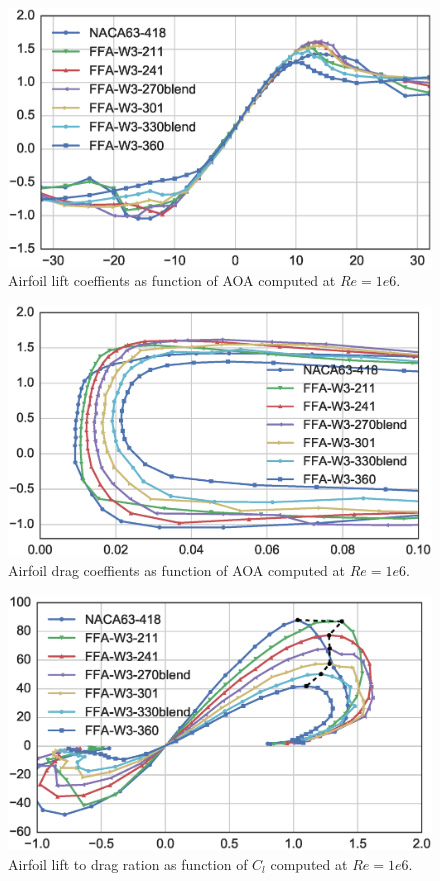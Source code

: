 \begin{figure}[!ht]
\begin{center}
	\includegraphics[width=0.8\linewidth]{figures/KB_airfoil_data_cl_detail.eps}
\end{center}
\caption{Airfoil lift coeffients as function of AOA computed at $Re=1e6$.}
\label{fig:baseline_cl}
\end{figure}

\begin{figure}[!ht]
\begin{center}
	\includegraphics[width=0.8\linewidth]{figures/KB_airfoil_data_cd_detail.eps}
\end{center}
\caption{Airfoil drag coeffients as function of AOA computed at $Re=1e6$.}
\label{fig:baseline_cd}
\end{figure}

\begin{figure}[!ht]
\begin{center}
	\includegraphics[width=0.8\linewidth]{figures/KB_airfoil_data_clcd_detail.eps}
\end{center}
\caption{Airfoil lift to drag ration as function of $C_l$ computed at $Re=1e6$.}
\label{fig:baseline_LD}
\end{figure}

